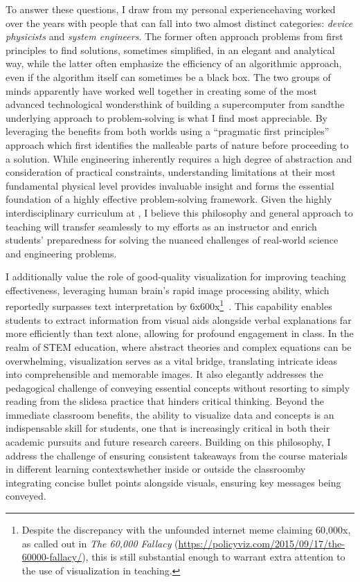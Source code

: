 To answer these questions, I draw from my personal experience\textemdash{}having worked over the years with people that can fall into two almost distinct categories: \emph{device physicists} and \emph{system engineers}. The former often approach problems from first principles to find solutions, sometimes simplified, in an elegant and analytical way, while the latter often emphasize the efficiency of an algorithmic approach, even if the algorithm itself can sometimes be a black box. The two groups of minds apparently have worked well together in creating some of the most advanced technological wonders\textemdash{}think of building a supercomputer from sand\textemdash{}the underlying approach to problem-solving is what I find most appreciable. By leveraging the benefits from both worlds using a ``pragmatic first principles'' approach which first identifies the malleable parts of nature before proceeding to a solution. While engineering inherently requires a high degree of abstraction and consideration of practical constraints, understanding limitations at their most fundamental physical level provides invaluable insight and forms the essential foundation of a highly effective problem-solving framework. Given the highly interdisciplinary curriculum at \appSchoolDeptShort{}, I believe this philosophy and general approach to teaching will transfer seamlessly to my efforts as an instructor and enrich students' preparedness for solving the nuanced challenges of real-world science and engineering problems.

I additionally value the role of good-quality visualization for improving teaching effectiveness, leveraging human brain's rapid image processing ability, which reportedly surpasses text interpretation by 6x\textendash 600x\footnote{
    Despite the discrepancy with the unfounded internet meme claiming 60,000x, as called out in \emph{The 60,000 Fallacy} (\url{https://policyviz.com/2015/09/17/the-60000-fallacy/}), this is still substantial enough to warrant extra attention to the use of visualization in teaching.
}~\cite{ResearchPictureWorth}. This capability enables students to extract information from visual aids alongside verbal explanations far more efficiently than text alone, allowing for profound engagement in class. In the realm of STEM education, where abstract theories and complex equations can be overwhelming, visualization serves as a vital bridge, translating intricate ideas into comprehensible and memorable images. It also elegantly addresses the pedagogical challenge of conveying essential concepts without resorting to simply reading from the slides\textemdash a practice that hinders critical thinking. Beyond the immediate classroom benefits, the ability to visualize data and concepts is an indispensable skill for students, one that is increasingly critical in both their academic pursuits and future research careers. Building on this philosophy, I address the challenge of ensuring consistent takeaways from the course materials in different learning contexts\textemdash whether inside or outside the classroom\textemdash by integrating concise bullet points alongside visuals, ensuring key messages being conveyed.

